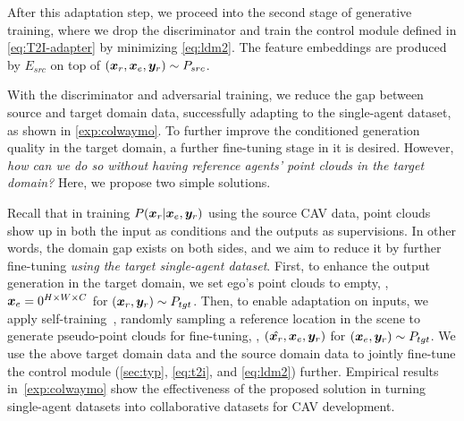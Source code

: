 After this adaptation step, we proceed into the second stage of generative training, where we drop the discriminator and train the control module defined in \cref{eq:T2I-adapter} by minimizing \cref{eq:ldm2}. The feature embeddings are produced by $E_{src}$ on top of $({\bm{x}}_r, {\bm{x}}_e, {\bm{y}}_r) \sim P_{src}$.


 With the discriminator and adversarial training,
we reduce the gap between source and target domain data, successfully adapting \ours to the single-agent dataset, as shown in \cref{exp:colwaymo}. To further improve the conditioned generation quality in the target domain, a further fine-tuning stage in it is desired. However, \emph{how can we do so without having reference agents' point clouds in the target domain?} Here, we propose two simple solutions.

Recall that in training $P({\bm{x}}_r|{\bm{x}}_e, {\bm{y}}_r)$ using the source CAV data, point clouds show up in both the input as conditions and the outputs as supervisions. In other words, the domain gap exists on both sides, and we aim to reduce it by further fine-tuning \emph{using the target single-agent dataset}.
First, to enhance the output generation in the target domain, we set ego's point clouds to empty, \ie, ${\bm{x}}_e={0}^{H \times W \times C}$ for $({\bm{x}}_r, {\bm{y}}_r) \sim P_{tgt}$. Then, to enable adaptation on inputs, we apply self-training~\citep{pan2023towards,zou2018unsupervised,zoph2020rethinking,lee2013pseudo}, randomly sampling a reference location in the scene to generate pseudo-point clouds for fine-tuning, \ie, $(\hat{{\bm{x}}_r}, {\bm{x}}_e, {\bm{y}}_r)$ for $({\bm{x}}_e, {\bm{y}}_r) \sim P_{tgt}$. We use the above target domain data and the source domain data to jointly fine-tune the control module (\cf \cref{sec:typ}, \cref{eq:t2i}, and \cref{eq:ldm2}) further. Empirical results in~\cref{exp:colwaymo} show the effectiveness of the proposed solution in turning single-agent datasets into collaborative datasets for CAV development.
